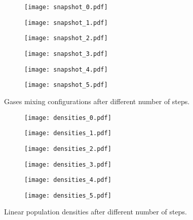 \documentclass{article}
\begin{document}
\begin{figure}[h!]
\centering
\begin{subfigure}[b]{0.32\textwidth}
\texttt{[image: snapshot\_0.pdf]}
\end{subfigure}
\begin{subfigure}[b]{0.32\textwidth}
\texttt{[image: snapshot\_1.pdf]}
\end{subfigure}
\begin{subfigure}[b]{0.32\textwidth}
\texttt{[image: snapshot\_2.pdf]}
\end{subfigure}
\begin{subfigure}[b]{0.32\textwidth}
\texttt{[image: snapshot\_3.pdf]}
\end{subfigure}
\begin{subfigure}[b]{0.32\textwidth}
\texttt{[image: snapshot\_4.pdf]}
\end{subfigure}
\begin{subfigure}[b]{0.32\textwidth}
\texttt{[image: snapshot\_5.pdf]}
\end{subfigure}
\caption{Gases mixing configurations after different number of steps.}
\label{configurations}
\end{figure}

\begin{figure}[h!]
\centering
\begin{subfigure}[b]{0.32\textwidth}
\texttt{[image: densities\_0.pdf]}
\end{subfigure}
\begin{subfigure}[b]{0.32\textwidth}
\texttt{[image: densities\_1.pdf]}
\end{subfigure}
\begin{subfigure}[b]{0.32\textwidth}
\texttt{[image: densities\_2.pdf]}
\end{subfigure}
\begin{subfigure}[b]{0.32\textwidth}
\texttt{[image: densities\_3.pdf]}
\end{subfigure}
\begin{subfigure}[b]{0.32\textwidth}
\texttt{[image: densities\_4.pdf]}
\end{subfigure}
\begin{subfigure}[b]{0.32\textwidth}
\texttt{[image: densities\_5.pdf]}
\end{subfigure}
\caption{Linear population densities after different number of steps.}
\label{densities}
\end{figure}
\end{document}
